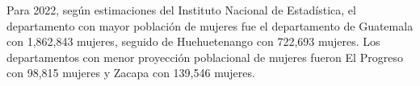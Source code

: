 Para 2022, según estimaciones del Instituto Nacional de Estadística, el departamento con mayor población de mujeres fue el departamento de Guatemala con 1,862,843 mujeres, seguido de Huehuetenango con 722,693 mujeres. Los departamentos con menor proyección poblacional de mujeres fueron El Progreso con 98,815 mujeres y Zacapa con 139,546 mujeres. 